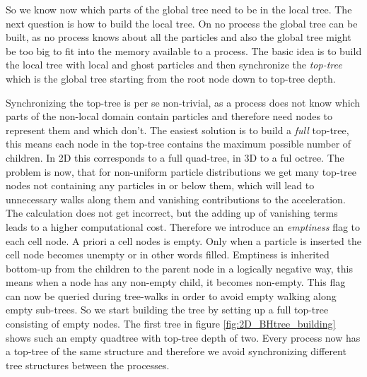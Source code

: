 So we know now which parts of the global tree need to be in the local tree. The next question is how to build the local tree. On no process the global tree can be built, as no process knows about all the particles and also the global tree might be too big to fit into the memory available to a process. The basic idea is to build the local tree with local and ghost particles and then synchronize the \emph{top-tree} which is the global tree starting from the root node down to top-tree depth.

Synchronizing the top-tree is per se non-trivial, as a process does not know which parts of the non-local domain contain particles and therefore need nodes to represent them and which don't. The easiest solution is to build a \emph{full} top-tree, this means each node in the top-tree contains the maximum possible number of children. In 2D this corresponds to a full quad-tree, in 3D to a ful octree. The problem is now, that for non-uniform particle distributions we get many top-tree nodes not containing any particles in or below them, which will lead to unnecessary walks along them and vanishing contributions to the acceleration. The calculation does not get incorrect, but the adding up of vanishing terms leads to a higher computational cost. Therefore we introduce an \emph{emptiness} flag to each cell node. A priori a cell nodes is empty. Only when a particle is inserted the cell node becomes unempty or in other words filled. Emptiness is inherited bottom-up from the children to the parent node in a logically negative way, this means when a node has any non-empty child, it becomes non-empty. This flag can now be queried during tree-walks in order to avoid empty walking along empty sub-trees. So we start building the tree by setting up a full top-tree consisting of empty nodes. The first tree in figure \ref{fig:2D_BHtree_building} shows such an empty quadtree with top-tree depth of two. Every process now has a top-tree of the same structure and therefore we avoid synchronizing different tree structures between the processes.\\

